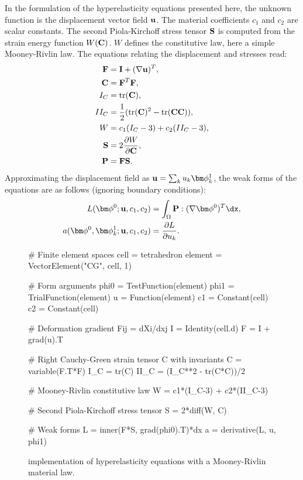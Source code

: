 In the formulation of the hyperelasticity equations presented here,
the unknown function is the displacement vector field $\mathbf{u}$.  The
material coefficients $c_1$ and $c_2$ are scalar constants.  The
second Piola-Kirchoff stress tensor $\mathbf{S}$ is computed from the strain
energy function $W(\mathbf{C})$. $W$ defines the constitutive law, here a
simple Mooney-Rivlin law. The equations relating the displacement and
stresses read:
\begin{align}
\begin{split}
\mathbf{F}   &=  \mathbf{I} + (\nabla \mathbf{u})^T, \\
\mathbf{C}   &=  \mathbf{F}^T\mathbf{F}, \\
I_C   &=  \operatorname{tr}(\mathbf{C}), \\
II_C  &=  \frac 1 2 (\operatorname{tr}(\mathbf{C})^2 - \operatorname{tr}(\mathbf{C}\mathbf{C})), \\
W     &=  c_1(I_C - 3) + c_2(II_C - 3), \\
\mathbf{S}   &=  2\frac{\partial W}{\partial\mathbf{C}}, \\
\mathbf{P}   &=  \mathbf{F}\mathbf{S}.
\end{split}
\end{align}
Approximating the displacement field as $\uu = \sum_k u_k \bphi^1_k$,
the weak forms of the equations are as follows (ignoring boundary conditions):
\begin{align}
L(\bphi^0; \uu, c_1, c_2) &= \int_\Omega \PP : (\nabla\bphi^0)^T \dx, \\
a(\bphi^0, \bphi^1_k; \uu, c_1, c_2) &= \frac{\partial L}{\partial u_k}.
\end{align}
\begin{figure}\label{ufl:fig:hypcode}
\begin{code}
# Finite element spaces
cell = tetrahedron
element = VectorElement("CG", cell, 1)

# Form arguments
phi0 = TestFunction(element)
phi1 = TrialFunction(element)
u = Function(element)
c1 = Constant(cell)
c2 = Constant(cell)

# Deformation gradient Fij = dXi/dxj
I = Identity(cell.d)
F = I + grad(u).T

# Right Cauchy-Green strain tensor C with invariants
C = variable(F.T*F)
I_C = tr(C)
II_C = (I_C**2 - tr(C*C))/2

# Mooney-Rivlin constitutive law
W = c1*(I_C-3) + c2*(II_C-3)

# Second Piola-Kirchoff stress tensor
S = 2*diff(W, C)

# Weak forms
L = inner(F*S, grad(phi0).T)*dx
a = derivative(L, u, phi1)
\end{code}
\caption{\ufl{} implementation of hyperelasticity equations with a Mooney-Rivlin material law.}
\end{figure}
